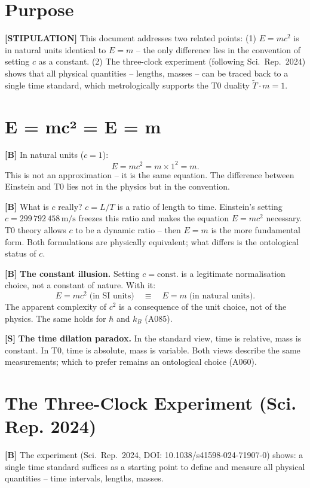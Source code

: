 \section{Purpose}

\textbf{[STIPULATION]} This document addresses two related points: (1)
$E=mc^2$ is in natural units identical to $E=m$ -- the only difference lies in
the convention of setting $c$ as a constant. (2) The three-clock experiment
(following Sci.\ Rep.\ 2024) shows that all physical quantities -- lengths, masses
-- can be traced back to a single time standard, which metrologically supports the
T0 duality $\tilde T\cdot m=1$.

\section{E = mc² = E = m}

\textbf{[B]} In natural units ($c=1$):
\[
  E = mc^2 = m\times1^2 = m.
\]
This is not an approximation -- it is the same equation. The difference between
Einstein and T0 lies not in the physics but in the convention.

\textbf{[B]} What is $c$ really? $c=L/T$ is a ratio of length to time. Einstein's
setting $c=299\,792\,458\,\text{m/s}$ freezes this ratio and makes the equation
$E=mc^2$ necessary. T0 theory allows $c$ to be a dynamic ratio -- then $E=m$ is
the more fundamental form. Both formulations are physically equivalent; what
differs is the ontological status of $c$.

\textbf{[B]} \textbf{The constant illusion.} Setting $c=\text{const.}$ is a
legitimate normalisation choice, not a constant of nature. With it:
\[
  E=mc^2\;\text{(in SI units)}
  \quad\equiv\quad
  E=m\;\text{(in natural units)}.
\]
The apparent complexity of $c^2$ is a consequence of the unit choice, not of the
physics. The same holds for $\hbar$ and $k_B$ (A085).

\textbf{[S]} \textbf{The time dilation paradox.} In the standard view, time is
relative, mass is constant. In T0, time is absolute, mass is variable. Both views
describe the same measurements; which to prefer remains an ontological choice (A060).

\section{The Three-Clock Experiment (Sci. Rep. 2024)}

\textbf{[B]} The experiment (Sci.\ Rep.\ 2024, DOI: 10.1038/s41598-024-71907-0)
shows: a single time standard suffices as a starting point to define and measure all
physical quantities -- time intervals, lengths, masses.

